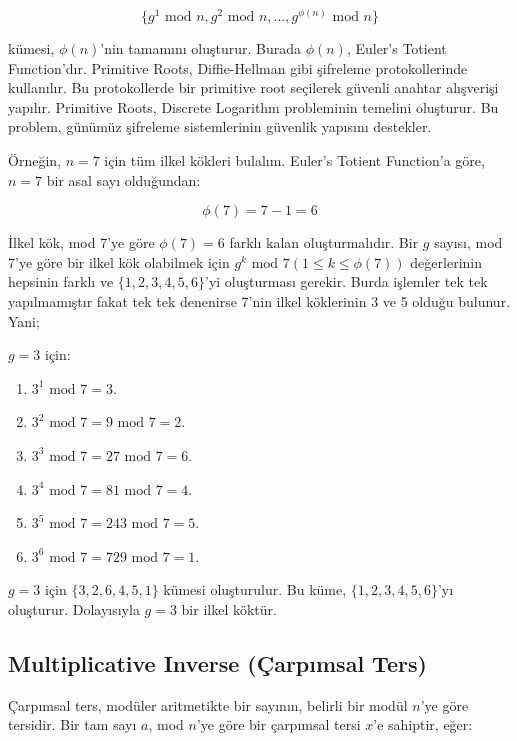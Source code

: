 \[ \{ g^1 \text{ mod } n, g^2 \text{ mod } n, ..., g^{\phi(n)} \text{ mod } n \} \]

kümesi, $\phi(n)$'nin tamamını oluşturur. Burada $\phi(n)$, Euler's Totient Function'dır. Primitive Roots, Diffie-Hellman gibi şifreleme protokollerinde kullanılır. Bu protokollerde bir primitive root seçilerek güvenli anahtar alışverişi yapılır. Primitive Roots, Discrete Logarithm probleminin temelini oluşturur. Bu problem, günümüz şifreleme sistemlerinin güvenlik yapısını destekler.

Örneğin, $n = 7$ için tüm ilkel kökleri bulalım. Euler's Totient Function'a göre, $n = 7$ bir asal sayı olduğundan:

\[ \phi(7) = 7 - 1 = 6 \]

İlkel kök, mod 7'ye göre $\phi(7) = 6$ farklı kalan oluşturmalıdır. Bir $g$ sayısı, mod 7'ye göre bir ilkel kök olabilmek için $g^k \text{ mod } 7 (1 \leq k \leq \phi(7))$ değerlerinin hepsinin farklı ve $\{ 1, 2, 3, 4, 5, 6 \}$'yi oluşturması gerekir. Burda işlemler tek tek yapılmamıştır fakat tek tek denenirse 7'nin ilkel köklerinin 3 ve 5 olduğu bulunur. Yani;

$g = 3$ için:

\begin{enumerate}
    \item $3^1 \text{ mod } 7 = 3$.
    \item $3^2 \text{ mod } 7 = 9 \text{ mod } 7 = 2$.
    \item $3^3 \text{ mod } 7 = 27 \text{ mod } 7 = 6$.
    \item $3^4 \text{ mod } 7 = 81 \text{ mod } 7 = 4$.
    \item $3^5 \text{ mod } 7 = 243 \text{ mod } 7 = 5$.
    \item $3^6 \text{ mod } 7 = 729 \text{ mod } 7 = 1$.
\end{enumerate}

$g = 3$ için $\{ 3, 2, 6, 4, 5, 1 \}$ kümesi oluşturulur. Bu küme, $\{ 1, 2, 3, 4, 5, 6 \}$'yı oluşturur. Dolayısıyla $g = 3$ bir ilkel köktür.

\newpage

\subsection{Multiplicative Inverse (Çarpımsal Ters)}

Çarpımsal ters, modüler aritmetikte bir sayının, belirli bir modül $n$'ye göre tersidir. Bir tam sayı $a$, mod $n$'ye göre bir çarpımsal tersi $x$'e sahiptir, eğer:

